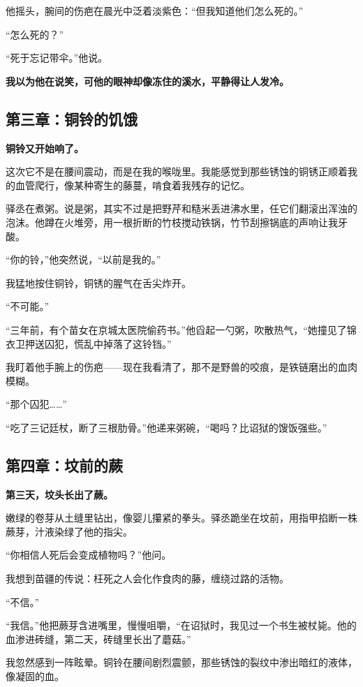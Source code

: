 \documentclass{article}
\begin{document}
	他摇头，腕间的伤疤在晨光中泛着淡紫色：“但我知道他们怎么死的。”  
	
	“怎么死的？”  
	
	“死于忘记带伞。”他说。  
	
	\textbf{我以为他在说笑，可他的眼神却像冻住的溪水，平静得让人发冷。  }
	
	
	\subsection{第三章：铜铃的饥饿}
	
	\textbf{铜铃又开始响了。 } 
	
	这次它不是在腰间震动，而是在我的喉咙里。我能感觉到那些锈蚀的铜锈正顺着我的血管爬行，像某种寄生的藤蔓，啃食着我残存的记忆。  
	
	驿丞在煮粥。说是粥，其实不过是把野芹和糙米丢进沸水里，任它们翻滚出浑浊的泡沫。他蹲在火堆旁，用一根折断的竹枝搅动铁锅，竹节刮擦锅底的声响让我牙酸。  
	
	“你的铃，”他突然说，“以前是我的。”  
	
	我猛地按住铜铃，铜锈的腥气在舌尖炸开。  
	
	“不可能。”  
	
	“三年前，有个苗女在京城太医院偷药书。”他舀起一勺粥，吹散热气，“她撞见了锦衣卫押送囚犯，慌乱中掉落了这铃铛。”  
	
	我盯着他手腕上的伤疤——现在我看清了，那不是野兽的咬痕，是铁链磨出的血肉模糊。  
	
	“那个囚犯……”  
	
	“吃了三记廷杖，断了三根肋骨。”他递来粥碗，“喝吗？比诏狱的馊饭强些。”  
	
	
	\subsection{第四章：坟前的蕨}
	
	\textbf{第三天，坟头长出了蕨。  }
	
	嫩绿的卷芽从土缝里钻出，像婴儿攥紧的拳头。驿丞跪坐在坟前，用指甲掐断一株蕨芽，汁液染绿了他的指尖。  
	
	“你相信人死后会变成植物吗？”他问。  
	
	我想到苗疆的传说：枉死之人会化作食肉的藤，缠绕过路的活物。  
	
	“不信。”  
	
	“我信。”他把蕨芽含进嘴里，慢慢咀嚼，“在诏狱时，我见过一个书生被杖毙。他的血渗进砖缝，第二天，砖缝里长出了蘑菇。”  
	
	我忽然感到一阵眩晕。铜铃在腰间剧烈震颤，那些锈蚀的裂纹中渗出暗红的液体，像凝固的血。  
	
\end{document}
